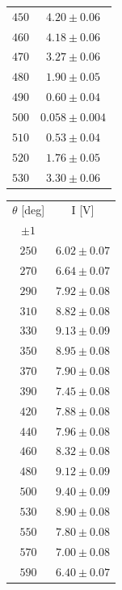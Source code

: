 \documentclass[10pt,oneside,a4paper]{article}
\begin{document}
\begin{table}[H]
\begin{tabular}{cc}
  $ 450$ &$ 4.20 \pm 0.06$ \\
  $ 460$ &$ 4.18 \pm 0.06$ \\
  $ 470$ &$ 3.27 \pm 0.06$ \\
  $ 480$ &$ 1.90 \pm 0.05$ \\
  $ 490$ &$ 0.60 \pm 0.04$ \\
  $ 500$ &$ 0.058 \pm 0.004$ \\
  $ 510$ &$ 0.53 \pm 0.04$ \\
  $ 520$ &$ 1.76 \pm 0.05$ \\
  $ 530$ &$ 3.30 \pm 0.06$ \\
\hline
\end{tabular}
\end{table}






\begin{table}[H]
\centering
{}
\label{tab:polarizzazione}
\begin{tabular}{cc}
\hline
 $\theta$ [deg]& I [V]\\
 $\pm 1$ & \\
\hline
  $ 250  $ & $ 6.02 \pm  0.07 $ \\
  $ 270  $ & $ 6.64 \pm  0.07 $ \\
  $ 290  $ & $ 7.92 \pm  0.08 $ \\
  $ 310  $ & $ 8.82 \pm  0.08 $ \\
  $ 330  $ & $ 9.13 \pm  0.09 $ \\
  $ 350  $ & $ 8.95 \pm  0.08 $ \\
  $ 370  $ & $ 7.90\pm  0.08 $ \\
  $ 390  $ & $ 7.45 \pm  0.08 $ \\
  $ 420  $ & $ 7.88 \pm  0.08 $ \\
  $ 440  $ & $ 7.96 \pm  0.08 $ \\
  $ 460  $ & $ 8.32 \pm  0.08 $ \\
  $ 480  $ & $ 9.12\pm  0.09 $ \\
  $ 500  $ & $ 9.40 \pm  0.09 $ \\
  $ 530  $ & $ 8.90 \pm  0.08 $ \\
  $ 550$ & $ 7.80 \pm  0.08 $  \\
 $570 $ & $7.00 \pm0.08 $\\
 $590$ & $6.40 \pm0.07 $\\
\hline
\end{tabular}
\end{table}
\end{document}
